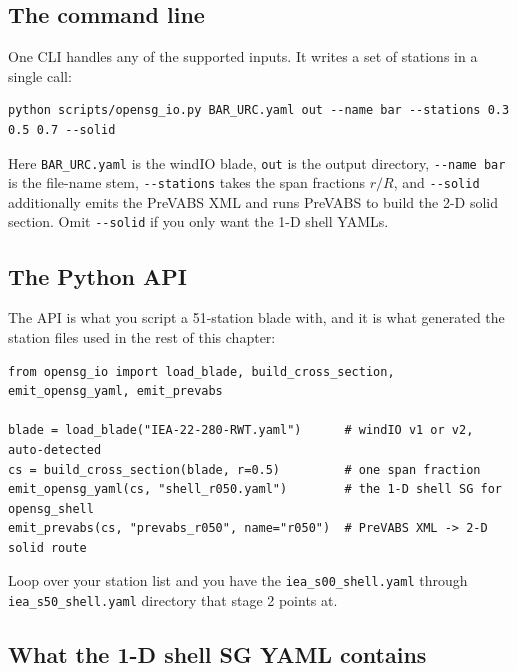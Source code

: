 \subsection*{The command line}

One CLI handles any of the supported inputs. It writes a set of stations in a
single call:

\begin{lstlisting}[style=shellst,basicstyle=\ttfamily\footnotesize]
python scripts/opensg_io.py BAR_URC.yaml out --name bar --stations 0.3 0.5 0.7 --solid
\end{lstlisting}

Here \texttt{BAR\_URC.yaml} is the windIO blade, \texttt{out} is the output
directory, \texttt{-{}-name bar} is the file-name stem, \texttt{-{}-stations}
takes the span fractions $r/R$, and \texttt{-{}-solid} additionally emits the
PreVABS XML and runs PreVABS to build the 2-D solid section. Omit
\texttt{-{}-solid} if you only want the 1-D shell YAMLs.

\subsection*{The Python API}

The API is what you script a 51-station blade with, and it is what generated
the station files used in the rest of this chapter:

\begin{lstlisting}[style=opensg,caption={Building one station's 1-D shell SG and its PreVABS twin.},basicstyle=\ttfamily\footnotesize]
from opensg_io import load_blade, build_cross_section, emit_opensg_yaml, emit_prevabs

blade = load_blade("IEA-22-280-RWT.yaml")      # windIO v1 or v2, auto-detected
cs = build_cross_section(blade, r=0.5)         # one span fraction
emit_opensg_yaml(cs, "shell_r050.yaml")        # the 1-D shell SG for opensg_shell
emit_prevabs(cs, "prevabs_r050", name="r050")  # PreVABS XML -> 2-D solid route
\end{lstlisting}

Loop over your station list and you have the \texttt{iea\_s00\_shell.yaml}
through \texttt{iea\_s50\_shell.yaml} directory that stage 2 points at.

\subsection*{What the 1-D shell SG YAML contains}

